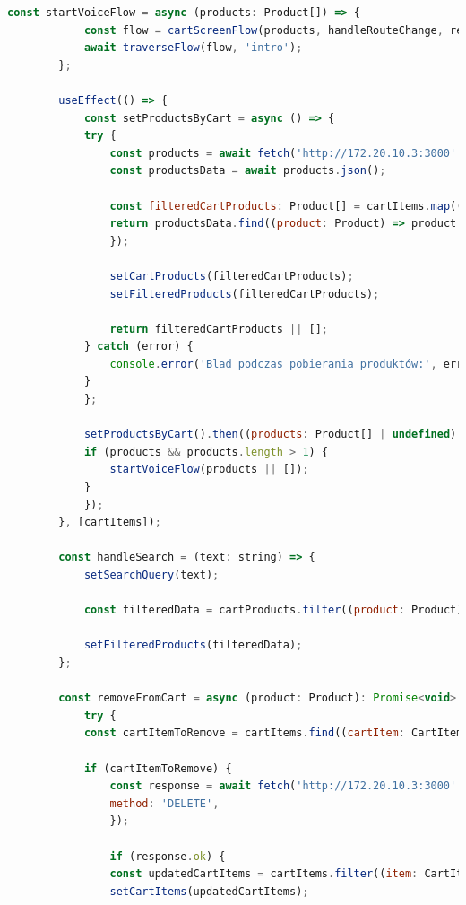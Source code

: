 \begin{lstlisting}[language=JavaScript, caption=Koszyk użytkownika implementacja, label=lst:cart_view]
        const startVoiceFlow = async (products: Product[]) => {
            const flow = cartScreenFlow(products, handleRouteChange, removeFromCart);
            await traverseFlow(flow, 'intro');
        };

        useEffect(() => {
            const setProductsByCart = async () => {
            try {
                const products = await fetch('http://172.20.10.3:3000' + `/products`);
                const productsData = await products.json();

                const filteredCartProducts: Product[] = cartItems.map((cartItem: CartItem) => {
                return productsData.find((product: Product) => product.product_id === cartItem.product_id);
                });

                setCartProducts(filteredCartProducts);
                setFilteredProducts(filteredCartProducts);

                return filteredCartProducts || [];
            } catch (error) {
                console.error('Blad podczas pobierania produktów:', error);
            }
            };

            setProductsByCart().then((products: Product[] | undefined) => {
            if (products && products.length > 1) {
                startVoiceFlow(products || []);
            }
            });
        }, [cartItems]);

        const handleSearch = (text: string) => {
            setSearchQuery(text);

            const filteredData = cartProducts.filter((product: Product) => product.name.toLowerCase().includes(text.toLowerCase()));

            setFilteredProducts(filteredData);
        };

        const removeFromCart = async (product: Product): Promise<void> => {
            try {
            const cartItemToRemove = cartItems.find((cartItem: CartItem) => cartItem.product_id === product.product_id);

            if (cartItemToRemove) {
                const response = await fetch('http://172.20.10.3:3000' + `/cart-items/${cartItemToRemove.cart_item_id}`, {
                method: 'DELETE',
                });

                if (response.ok) {
                const updatedCartItems = cartItems.filter((item: CartItem) => item.cart_item_id !== cartItemToRemove.cart_item_id);
                setCartItems(updatedCartItems);


\end{lstlisting}
